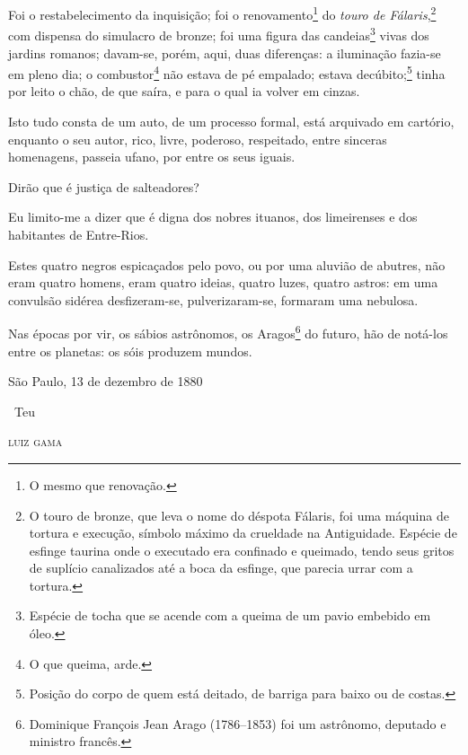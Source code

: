 {Foi o restabelecimento da inquisição; foi o renovamento\footnote{O
  mesmo que renovação.} do \emph{touro de Fálaris},\footnote{O touro de
  bronze, que leva o nome do déspota Fálaris, foi uma máquina de tortura
  e execução, símbolo máximo da crueldade na Antiguidade. Espécie de
  esfinge taurina onde o executado era confinado e queimado, tendo seus
  gritos de suplício canalizados até a boca da esfinge, que parecia
  urrar com a tortura.} com dispensa do simulacro de bronze; foi uma
figura das candeias\footnote{Espécie de tocha que se acende com a
  queima de um pavio embebido em óleo.} vivas dos jardins romanos;
davam-se, porém, aqui, duas diferenças: a iluminação fazia-se em pleno
dia; o combustor\footnote{O que queima, arde.} não estava de pé
empalado; estava decúbito;\footnote{Posição do corpo de quem está
  deitado, de barriga para baixo ou de costas.} tinha por leito o chão,
de que saíra, e para o qual ia volver em cinzas.

Isto tudo consta de um auto, de um processo formal, está arquivado em
cartório, enquanto o seu autor, rico, livre, poderoso, respeitado, entre
sinceras homenagens, passeia ufano, por entre os seus iguais.

Dirão que é justiça de salteadores?

Eu limito-me a dizer que é digna dos nobres ituanos, dos limeirenses e
dos habitantes de Entre-Rios.

Estes quatro negros espicaçados pelo povo, ou por uma aluvião de
abutres, não eram quatro homens, eram quatro ideias, quatro luzes,
quatro astros: em uma convulsão sidérea desfizeram-se, pulverizaram-se,
formaram uma nebulosa.

Nas épocas por vir, os sábios astrônomos, os Aragos\footnote{Dominique
  François Jean Arago (1786--1853) foi um astrônomo, deputado e ministro
  francês.} do futuro, hão
de notá-los entre os planetas: os sóis produzem mundos.

\medskip

\hfill São Paulo, 13 de dezembro de 1880

\hfill\ Teu

\hfill\textsc{luiz gama}


}
